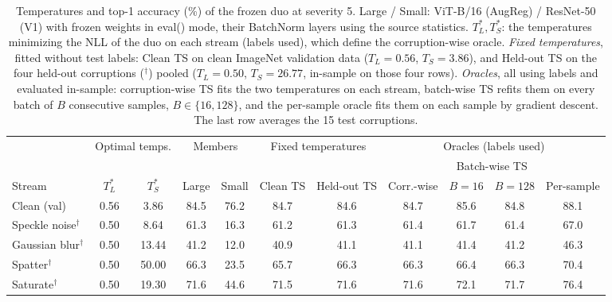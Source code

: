 \begin{table}[t]
    \centering
    \small
    \setlength{\tabcolsep}{4.5pt}
    \caption{Temperatures and top-1 accuracy (\%) of the frozen duo at severity 5. Large / Small: ViT-B/16 (AugReg) / ResNet-50 (V1) with frozen weights in eval() mode, their BatchNorm layers using the source statistics. $T_L^*, T_S^*$: the temperatures minimizing the NLL of the duo on each stream (labels used), which define the corruption-wise oracle. \emph{Fixed temperatures}, fitted without test labels: Clean TS on clean ImageNet validation data ($T_L = 0.56$, $T_S = 3.86$), and Held-out TS on the four held-out corruptions ($^\dagger$) pooled ($T_L = 0.50$, $T_S = 26.77$, in-sample on those four rows). \emph{Oracles}, all using labels and evaluated in-sample: corruption-wise TS fits the two temperatures on each stream, batch-wise TS refits them on every batch of $B$ consecutive samples, $B \in \{16, 128\}$, and the per-sample oracle fits them on each sample by gradient descent. The last row averages the 15 test corruptions.}
    \label{tab:temperatures:frozen__vitb16aug_rn50v1}
    \label{tab:oracles:frozen__vitb16aug_rn50v1}
    \begin{tabular}{l|cc|cc|cc|cccc}
        \toprule
        & \multicolumn{2}{c|}{Optimal temps.} & \multicolumn{2}{c|}{Members} & \multicolumn{2}{c|}{Fixed temperatures} & \multicolumn{4}{c}{Oracles (labels used)} \\
         &  &  &  &  &  &  &  & \multicolumn{2}{c}{Batch-wise TS} &  \\
        \cmidrule(lr){9-10}
        Stream & $T_L^*$ & $T_S^*$ & Large & Small & Clean TS & Held-out TS & Corr.-wise & $B{=}16$ & $B{=}128$ & Per-sample \\
        \midrule
        Clean (val) & 0.56 & 3.86 & 84.5 & 76.2 & 84.7 & 84.6 & 84.7 & 85.6 & 84.8 & 88.1 \\
        \midrule
        Speckle noise$^\dagger$ & 0.50 & 8.64 & 61.3 & 16.3 & 61.2 & 61.3 & 61.4 & 61.7 & 61.4 & 67.0 \\
        Gaussian blur$^\dagger$ & 0.50 & 13.44 & 41.2 & 12.0 & 40.9 & 41.1 & 41.1 & 41.4 & 41.2 & 46.3 \\
        Spatter$^\dagger$ & 0.50 & 50.00 & 66.3 & 23.5 & 65.7 & 66.3 & 66.3 & 66.4 & 66.3 & 70.4 \\
        Saturate$^\dagger$ & 0.50 & 19.30 & 71.6 & 44.6 & 71.5 & 71.6 & 71.6 & 72.1 & 71.7 & 76.4 \\
        \midrule

\end{tabular}
\end{table}
